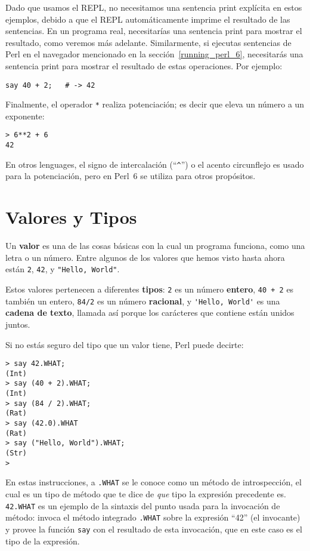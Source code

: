 Dado que usamos el REPL, no necesitamos una sentencia print explícita
en estos ejemplos, debido a que el REPL automáticamente imprime el resultado de las sentencias. En un programa real, necesitarías una sentencia print para mostrar el resultado, como veremos más adelante. Similarmente, si ejecutas sentencias de Perl en el navegador mencionado en la sección~\ref{running_perl_6}, necesitarás una sentencia print para mostrar el resultado de estas operaciones.
Por ejemplo:

\begin{verbatim}
say 40 + 2;   # -> 42
\end{verbatim}


Finalmente, el operador {\tt **} realiza potenciación; es decir que eleva un número a un exponente:

\begin{verbatim}
> 6**2 + 6
42
\end{verbatim}
%
En otros lenguages, el signo de intercalación (``\verb"^"'') o el acento circunflejo es usado para la potenciación, pero en Perl~6 se utiliza para otros propósitos.
%


\section{Valores y Tipos}
\label{values_and_types}

Un {\bf valor} es una de las cosas básicas con la cual un programa funciona,
como una letra o un número. Entre algunos de los valores que hemos visto hasta ahora
están {\tt 2}, {\tt 42}, y \verb'"Hello, World"'.

Estos valores pertenecen a diferentes {\bf tipos}: 
{\tt 2} es un número {\bf entero}, {\tt 40 + 2} es también un entero, 
{\tt 84/2} es un número {\bf racional}, y  \verb"'Hello, World'" es una
{\bf cadena de texto}, llamada así porque los carácteres que contiene están
unidos juntos.

Si no estás seguro del tipo que un valor tiene, Perl puede decirte:

\begin{verbatim}
> say 42.WHAT;
(Int)
> say (40 + 2).WHAT;
(Int)
> say (84 / 2).WHAT;
(Rat)
> say (42.0).WHAT
(Rat)
> say ("Hello, World").WHAT;
(Str)
>
\end{verbatim}
%
En estas instrucciones, a {\tt .WHAT} se le conoce como un método 
de introspección, el cual es un tipo de método que te dice de \emph{que}
tipo la expresión precedente es. {\tt 42.WHAT} es un ejemplo de la sintaxis 
del punto usada para la invocación de método: invoca el método integrado
{\tt .WHAT} sobre la expresión ``42'' (el invocante) y provee la función {\tt say}
con el resultado de esta invocación, que en este caso es el tipo de la expresión.

